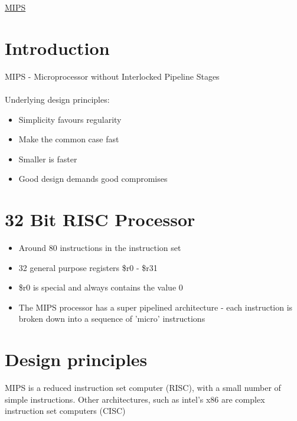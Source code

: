\documentclass{article}[18pt]
\begin{document}
\begin{center}
\underline{\huge MIPS}
\end{center}
\section{Introduction}
MIPS - Microprocessor without Interlocked Pipeline Stages\\
\\
Underlying design principles:
\begin{itemize}
	\item Simplicity favours regularity
	\item Make the common case fast
	\item Smaller is faster
	\item Good design demands good compromises 
\end{itemize}
\section{32 Bit RISC Processor}
\begin{itemize}
	\item Around 80 instructions in the instruction set
	\item 32 general purpose registers \$r0 - \$r31
	\item \$r0 is special and always contains the value 0
	\item The MIPS processor has a super pipelined architecture - each instruction is broken down into a sequence of 'micro' instructions
\end{itemize}
\section{Design principles}
MIPS is a reduced instruction set computer (RISC), with a small number of simple instructions. Other architectures, such as intel's x86 are complex instruction set computers (CISC)
\end{document}
